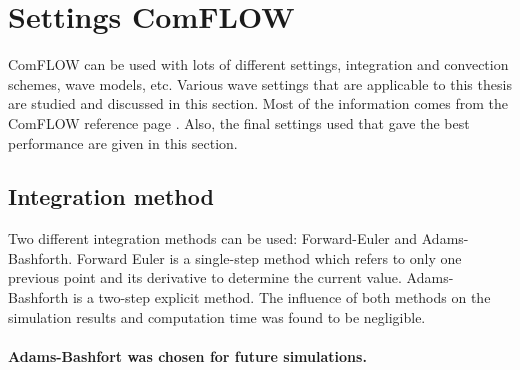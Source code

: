 

\section{Settings ComFLOW}
\label{sec: possible settings ComFLOW}
ComFLOW can be used with lots of different settings, integration and convection schemes, wave models, etc. Various wave settings that are applicable to this thesis are studied and discussed in this section. Most of the information comes from the ComFLOW reference page \citep{poseidon_comflow_reference_page}. Also, the final settings used that gave the best performance are given in this section.

\subsection{Integration method}

Two different integration methods can be used: Forward-Euler and Adams-Bashforth. Forward Euler is a single-step method which refers to only one previous point and its derivative to determine the current value. Adams-Bashforth is a two-step explicit method. The influence of both methods on the simulation results and computation time was found to be negligible.\\
\\
\textbf{Adams-Bashfort was chosen for future simulations.}

